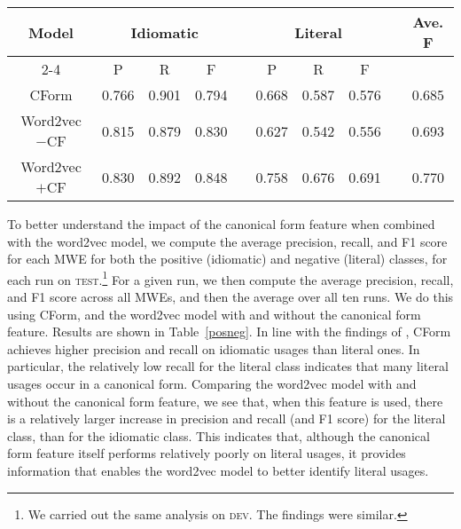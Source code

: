 \documentclass[11pt,a4paper]{article}
\newcommand{\tabref}[1]{Table~\ref{#1}}
\newcommand{\dev}{\textsc{dev}\xspace}
\newcommand{\test}{\textsc{test}\xspace}
\begin{document}
 \begin{table*}
 \begin{center}
 \begin{tabular}{cccccccccc}
\multirow{2}{*}{Model} &\multicolumn{3}{c}{Idiomatic} & &
\multicolumn{3}{c}{Literal} & & \multirow{2}{*}{Ave. F} \\ 

\cline{2-4} \cline{6-8} &P & R & F & &P & R & F & & \\ \hline

CForm&0.766& 0.901 &0.794& & 0.668&0.587&0.576& & 0.685 \\

Word2vec $-$CF &0.815&0.879&0.830&& 0.627&0.542&0.556&& 0.693\\

Word2vec $+$CF& 0.830 &0.892& 0.848 & & 0.758 & 0.676 & 0.691 & & 0.770\\
 \end{tabular}
 \caption{Precision (P), recall (R), and F1 score (F), for the
   idiomatic and literal classes, as well as average F1 score
   (Ave. F), for \test.\label{posneg}}
 \end{center}
 \end{table*}

To better understand the impact of the canonical form feature when
combined with the word2vec model, we compute the average precision,
recall, and F1 score for each MWE for both the positive (idiomatic)
and negative (literal) classes, for each run on \test.\footnote{We
  carried out the same analysis on \dev. The findings were similar.}
For a given run, we then compute the average precision, recall, and F1
score across all MWEs, and then the average over all ten runs. We do
this using CForm, and the word2vec model with and without the
canonical form feature. Results are shown in \tabref{posneg}. In line
with the findings of , CForm achieves higher
precision and recall on idiomatic usages than literal ones. In
particular, the relatively low recall for the literal class indicates
that many literal usages occur in a canonical form. Comparing the
word2vec model with and without the canonical form feature, we see
that, when this feature is used, there is a relatively larger increase
in precision and recall (and F1 score) for the literal class, than for
the idiomatic class. This indicates that, although the canonical form
feature itself performs relatively poorly on literal usages, it
provides information that enables the word2vec model to better
identify literal usages.
\end{document}
